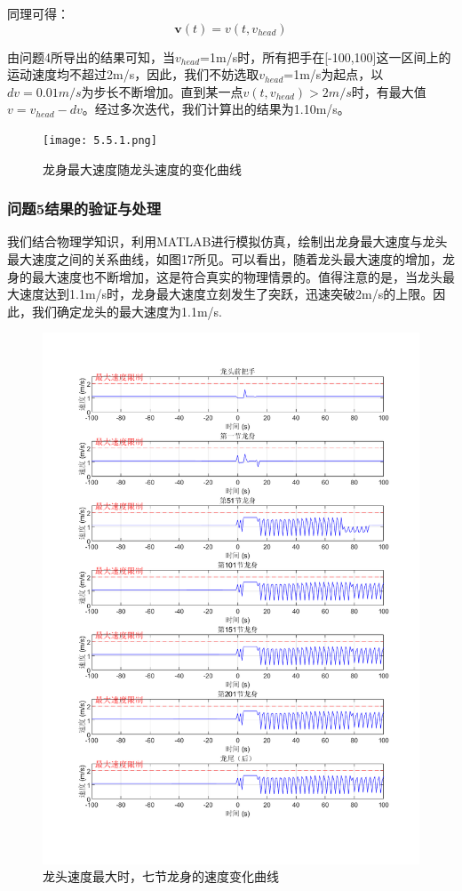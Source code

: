 \documentclass{cumcmthesis1}
\begin{document}
\par
同理可得：
\begin{equation}
    \textbf{v}(t) = v(t,v_{head})
\end{equation}
\par
由问题4所导出的结果可知，当$v_{head}$=1m/s时，所有把手在[-100,100]这一区间上的运动速度均不超过2m/s，因此，我们不妨选取$v_{head}$=1m/s为起点，以$dv=0.01m/s$为步长不断增加。直到某一点$v(t,v_{head}) >2m/s$时，有最大值$v=v_{head}-dv$。经过多次迭代，我们计算出的结果为1.10m/s。
\begin{figure}[ht]
    \caption{龙身最大速度随龙头速度的变化曲线}
    \centering    
    \texttt{[image: 5.5.1.png]}
\end{figure}

\subsubsection{问题5结果的验证与处理}
我们结合物理学知识，利用MATLAB进行模拟仿真，绘制出龙身最大速度与龙头最大速度之间的关系曲线，如图17所见。可以看出，随着龙头最大速度的增加，龙身的最大速度也不断增加，这是符合真实的物理情景的。值得注意的是，当龙头最大速度达到1.1m/s时，龙身最大速度立刻发生了突跃，迅速突破2m/s的上限。因此，我们确定龙头的最大速度为1.1m/s.

\begin{figure}[ht]
    \caption{龙头速度最大时，七节龙身的速度变化曲线}
    \centering    
    \includegraphics[width=0.7\linewidth]{5.5.3.png}
\end{figure}
\end{document}
